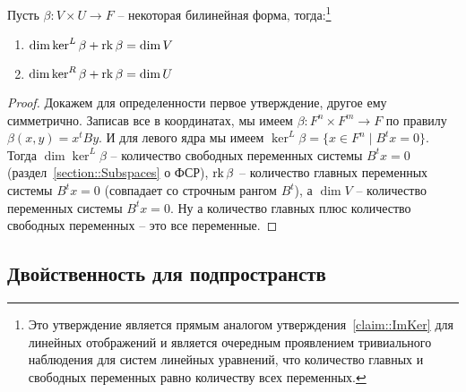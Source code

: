 \begin{claim}\label{claim::BilinearKernels}
Пусть $\beta\colon V\times U\to F$ -- некоторая билинейная форма, тогда:\footnote{Это утверждение является прямым аналогом утверждения~\ref{claim::ImKer} для линейных отображений и является очередным проявлением тривиального наблюдения для систем линейных уравнений, что количество главных и свободных переменных равно количеству всех переменных.}
\begin{enumerate}
\item $\dim\ker^L \beta + \operatorname{rk} \beta = \dim V$
\item $\dim\ker^R \beta + \operatorname{rk} \beta = \dim U$
\end{enumerate}
\end{claim}
\begin{proof}
Докажем для определенности первое утверждение, другое ему симметрично. Записав все в координатах, мы имеем $\beta \colon F^n \times F^m \to F$ по правилу $\beta(x,y) = x^t By$. И для левого ядра мы имеем $\ker^L \beta = \{x\in F^n \mid B^t x = 0\}$. Тогда $\dim \ker^L\beta$ -- количество свободных переменных системы $B^t x=0$ (раздел~\ref{section::Subspaces} о ФСР), $\operatorname{rk} \beta$ -- количество главных переменных системы $B^t x = 0$ (совпадает со строчным рангом $B^t$), а $\dim V $ -- количество переменных системы $B^t x = 0$. Ну а количество главных плюс количество свободных переменных -- это все переменные.
\end{proof}

\subsection{Двойственность для подпространств}

